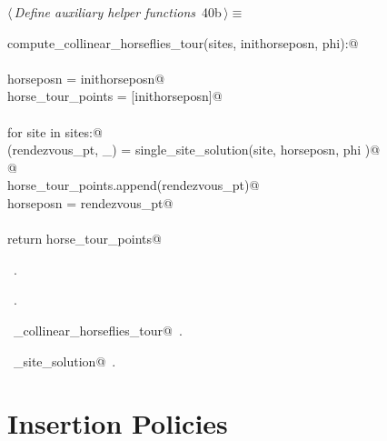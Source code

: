 \documentclass[11.5pt]{report}
\begin{document}
\begin{flushleft} \small
\begin{minipage}{\linewidth}\label{scrap45}\raggedright\small
{} $\langle\,${\itshape Define auxiliary helper functions}\nobreak\ {\footnotesize {40b}}$\,\rangle\equiv$
\vspace{-1ex}
\begin{list}{}{} \item
\mbox{}\verb@def compute_collinear_horseflies_tour(sites, inithorseposn, phi):@\\
\mbox{}\verb@@\\
\mbox{}\verb@      horseposn         = inithorseposn@\\
\mbox{}\verb@      horse_tour_points = [inithorseposn]@\\
\mbox{}\verb@@\\
\mbox{}\verb@      for site in sites:@\\
\mbox{}\verb@          (rendezvous_pt, _) = single_site_solution(site, horseposn, phi )@\\
\mbox{}\verb@            @\\
\mbox{}\verb@          horse_tour_points.append(rendezvous_pt)@\\
\mbox{}\verb@          horseposn = rendezvous_pt@\\
\mbox{}\verb@@\\
\mbox{}\verb@      return horse_tour_points@\\
\mbox{}\verb@@{\NWsep}
\end{list}
\vspace{-1.5ex}
\footnotesize
\begin{list}{}{\setlength{\itemsep}{-\parsep}\setlength{\itemindent}{-\leftmargin}}
\item \NWtxtMacroDefBy\ .
\item \NWtxtMacroRefIn\ .
\item \NWtxtIdentsDefed\nobreak\  \verb@compute_collinear_horseflies_tour@\nobreak\ .\item \NWtxtIdentsUsed\nobreak\  \verb@single_site_solution@\nobreak\ .
\item{}
\end{list}
\end{minipage}\vspace{4ex}
\end{flushleft}
\section{Insertion Policies} 
\label{subsec:insertion-policies}
\end{document}
